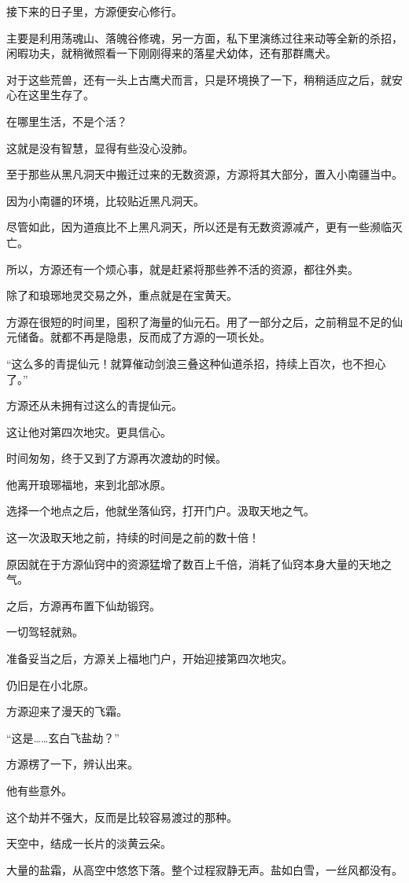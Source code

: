 \begin{this_body}
接下来的日子里，方源便安心修行。

主要是利用荡魂山、落魄谷修魂，另一方面，私下里演练过往来动等全新的杀招，闲暇功夫，就稍微照看一下刚刚得来的落星犬幼体，还有那群鹰犬。

对于这些荒兽，还有一头上古鹰犬而言，只是环境换了一下，稍稍适应之后，就安心在这里生存了。

在哪里生活，不是个活？

这就是没有智慧，显得有些没心没肺。

至于那些从黑凡洞天中搬迁过来的无数资源，方源将其大部分，置入小南疆当中。

因为小南疆的环境，比较贴近黑凡洞天。

尽管如此，因为道痕比不上黑凡洞天，所以还是有无数资源减产，更有一些濒临灭亡。

所以，方源还有一个烦心事，就是赶紧将那些养不活的资源，都往外卖。

除了和琅琊地灵交易之外，重点就是在宝黄天。

方源在很短的时间里，囤积了海量的仙元石。用了一部分之后，之前稍显不足的仙元储备。就都不再是隐患，反而成了方源的一项长处。

“这么多的青提仙元！就算催动剑浪三叠这种仙道杀招，持续上百次，也不担心了。”

方源还从未拥有过这么的青提仙元。

这让他对第四次地灾。更具信心。

时间匆匆，终于又到了方源再次渡劫的时候。

他离开琅琊福地，来到北部冰原。

选择一个地点之后，他就坐落仙窍，打开门户。汲取天地之气。

这一次汲取天地之前，持续的时间是之前的数十倍！

原因就在于方源仙窍中的资源猛增了数百上千倍，消耗了仙窍本身大量的天地之气。

之后，方源再布置下仙劫锻窍。

一切驾轻就熟。

准备妥当之后，方源关上福地门户，开始迎接第四次地灾。

仍旧是在小北原。

方源迎来了漫天的飞霜。

“这是……玄白飞盐劫？”

方源楞了一下，辨认出来。

他有些意外。

这个劫并不强大，反而是比较容易渡过的那种。

天空中，结成一长片的淡黄云朵。

大量的盐霜，从高空中悠悠下落。整个过程寂静无声。盐如白雪，一丝风都没有。


\end{this_body}
